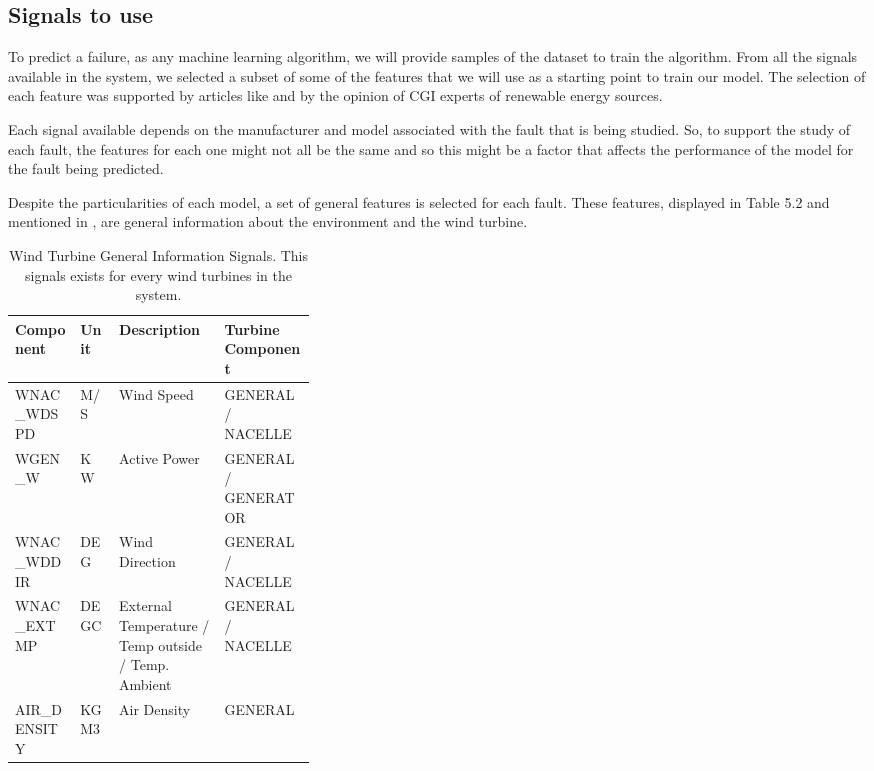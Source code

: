
\subsection{Signals to use} 
\label{sub:if_you_use_this_template} 


To predict a failure, as any machine learning algorithm, we will provide samples of the dataset to train the algorithm. From all the signals available in the system, we selected a subset of some of the features that we will use as a starting point to train our model. The selection of each feature was supported by articles like \cite{OLD_41_WIND} and by the opinion of CGI experts of renewable energy sources.

Each signal available depends on the manufacturer and model associated with the fault that is being studied. So, to support the study of each fault, the features for each one might not all be the same and so this might be a factor that affects the performance of the model for the fault being predicted.

Despite the particularities of each model, a set of general features is selected for each fault. These features, displayed in Table 5.2 and mentioned in \cite{OLD_41_WIND}, are general information about the environment and the wind turbine.

\begin{table}[!ht]
    \centering
    \begin{tabular}{|l|l|p{0.35\linewidth}|l|}
    \hline
        Component & Unit & Description & Turbine Component \\ \hline
        WNAC\_WDSPD & M/S & Wind Speed & GENERAL / NACELLE \\ \hline
        WGEN\_W & KW & Active Power & GENERAL / GENERATOR \\ \hline
        WNAC\_WDDIR & DEG & Wind Direction & GENERAL / NACELLE \\ \hline
        WNAC\_EXTMP & DEGC & External Temperature / Temp outside / Temp. Ambient & GENERAL / NACELLE \\ \hline
        AIR\_DENSITY & KGM3 & Air Density & GENERAL \\ \hline
    \end{tabular}
    \caption{Wind Turbine General Information Signals. This signals exists for every wind turbines in the system.}
    \label{GeneralSignals}
\end{table}

